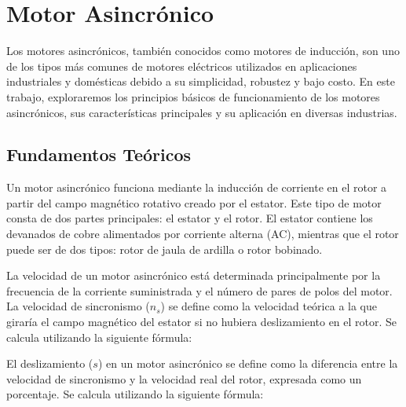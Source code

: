 \documentclass[../main]{subfiles}
\begin{document}
\section*{Motor Asincrónico}

Los motores asincrónicos, también conocidos como motores de inducción, son uno de los tipos más comunes de motores eléctricos utilizados en aplicaciones industriales y domésticas debido a su simplicidad, robustez y bajo costo. En este trabajo, exploraremos los principios básicos de funcionamiento de los motores asincrónicos, sus características principales y su aplicación en diversas industrias.

\subsection*{Fundamentos Teóricos}

Un motor asincrónico funciona mediante la inducción de corriente en el rotor a partir del campo magnético rotativo creado por el estator. Este tipo de motor consta de dos partes principales: el estator y el rotor. El estator contiene los devanados de cobre alimentados por corriente alterna (AC), mientras que el rotor puede ser de dos tipos: rotor de jaula de ardilla o rotor bobinado.

La velocidad de un motor asincrónico está determinada principalmente por la frecuencia de la corriente suministrada y el número de pares de polos del motor. La velocidad de sincronismo ($n_s$) se define como la velocidad teórica a la que giraría el campo magnético del estator si no hubiera deslizamiento en el rotor. Se calcula utilizando la siguiente fórmula:


El deslizamiento ($s$) en un motor asincrónico se define como la diferencia entre la velocidad de sincronismo y la velocidad real del rotor, expresada como un porcentaje. Se calcula utilizando la siguiente fórmula:
\end{document}
